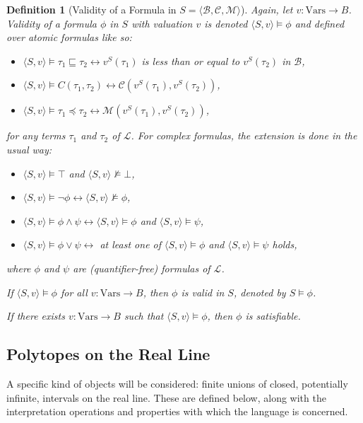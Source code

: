 \documentclass{article}
\newtheorem*{definition}{Definition}
\newcommand{\B}{\mathcal{B}}
\newcommand{\lang}{\mathcal{L}}
\newcommand{\Vars}{\text{Vars}}
\newcommand{\lpart}{\sqsubseteq}
\newcommand{\lcont}{C}
\newcommand{\lmeasure}{\preceq}
\begin{document}
\begin{definition}[Validity of a Formula in $S = \langle \B, \mathcal{C}, \mathcal{M} \rangle$]
  Again, let $v: \Vars \rightarrow B$. Validity of a formula $\phi$ in $S$ with valuation $v$ is denoted $\langle S, v \rangle \models \phi$ and defined over atomic formulas like so:
  \begin{itemize}
  \item $\langle S, v \rangle \models \tau_1 \lpart \tau_2 \leftrightarrow v^S(\tau_1)$ is less than or equal to $v^S(\tau_2)$ in $\B$,
  \item $\langle S, v \rangle \models \lcont(\tau_1, \tau_2) \leftrightarrow \mathcal{C}(v^S(\tau_1), v^S(\tau_2))$,
  \item $\langle S, v \rangle \models \tau_1 \lmeasure \tau_2 \leftrightarrow \mathcal{M}(v^S(\tau_1), v^S(\tau_2))$,
  \end{itemize}
  for any terms $\tau_1$ and $\tau_2$ of $\lang$. For complex formulas, the extension is done in the usual way:
  \begin{itemize}
  \item $\langle S, v \rangle \models \top$ and $\langle S, v \rangle \not \models \bot$,
  \item $\langle S, v \rangle \models \lnot \phi \leftrightarrow \langle S, v \rangle \not\models \phi$,
  \item $\langle S, v \rangle \models \phi \land \psi \leftrightarrow \langle S, v \rangle \models \phi$ and $\langle S, v \rangle \models \psi$,
  \item $\langle S, v \rangle \models \phi \lor \psi \leftrightarrow$ at least one of  $\langle S, v \rangle \models \phi$ and $\langle S, v \rangle \models \psi$ holds,
  \end{itemize}
  where $\phi$ and $\psi$ are (quantifier-free) formulas of $\lang$.

  If $\langle S, v \rangle \models \phi$ for all $v: \Vars \rightarrow B$, then $\phi$ is valid in $S$, denoted by $S \models \phi$.

  If there exists $v: \Vars \rightarrow B$ such that $\langle S, v \rangle \models \phi$, then $\phi$ is satisfiable.
\end{definition}

\subsection{Polytopes on the Real Line}

A specific kind of objects will be considered: finite unions of closed, potentially infinite, intervals on the real line. These are defined below, along with the interpretation operations and properties with which the language is concerned.
\end{document}
